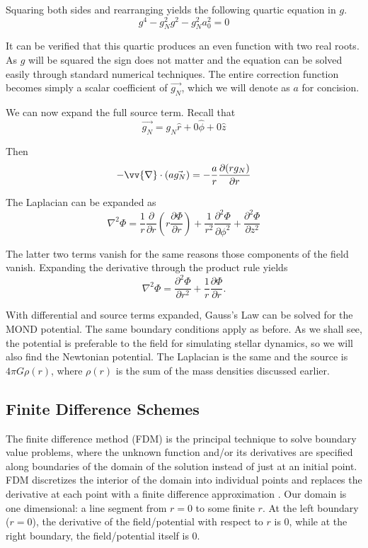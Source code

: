 \documentclass[11pt, twocolumn]{article}
\newcommand{\ff}[2]{\frac{#1}{#2}}
\newcommand{\pa}{\partial}
\newcommand{\ppaf}[2]{\ff{\pa^2 #1}{\pa {#2}^2}}
\renewcommand{\div}{\vv{\nabla} \cdot}
\begin{document}
    Squaring both sides and rearranging yields the following quartic equation in $g$.
    \begin{equation} g^4 - g_N^2g^2 - g_N^2a_0^2 = 0 \end{equation}

    It can be verified that this quartic produces an even function with two real roots. As $g$ will be squared the sign does not matter and the equation can be solved easily through standard numerical techniques. The entire correction function becomes simply a scalar coefficient of $\vec{g_N}$, which we will denote as $a$ for concision.

    We can now expand the full source term. Recall that
    \begin{equation} \vec{g_N} = g_N\hat{r} + 0\hat{\phi} + 0\hat{z} \end{equation}

    Then 
    \begin{equation} -\div (a\vec{g_N}) = -\frac{a}{r}\frac{\partial (rg_N)}{\partial r} \end{equation}
    
    The Laplacian can be expanded as 
    \begin{equation} \nabla^2 \Phi = \frac{1}{r}\frac{\partial }{\partial r}(r\frac{\partial \Phi}{\partial r}) + \frac{1}{r^2}\ppaf{\Phi}{\phi} + \ppaf{\Phi}{z} \end{equation}

    The latter two terms vanish for the same reasons those components of the field vanish. Expanding the derivative through the product rule yields
    \begin{equation} \nabla^2 \Phi = \ppaf{\Phi}{r} + \frac{1}{r}\frac{\partial \Phi}{\partial r}. \end{equation}

    With differential and source terms expanded, Gauss's Law can be solved for the MOND potential. The same boundary conditions apply as before. As we shall see, the potential is preferable to the field for simulating stellar dynamics, so we will also find the Newtonian potential. The Laplacian is the same and the source is $4\pi G\rho (r)$, where $\rho (r)$ is the sum of the mass densities discussed earlier. 
    
    \subsection*{Finite Difference Schemes}
    The finite difference method (FDM) is the principal technique to solve boundary value problems, where the unknown function and/or its derivatives are specified along boundaries of the domain of the solution instead of just at an initial point. FDM discretizes the interior of the domain into individual points and replaces the derivative at each point with a finite difference approximation \parencite{sauer_numerical_2017}. Our domain is one dimensional: a line segment from $r = 0$ to some finite $r$. At the left boundary ($r = 0$), the derivative of the field/potential with respect to $r$ is $0$, while at the right boundary, the field/potential itself is $0$. 
\end{document}
